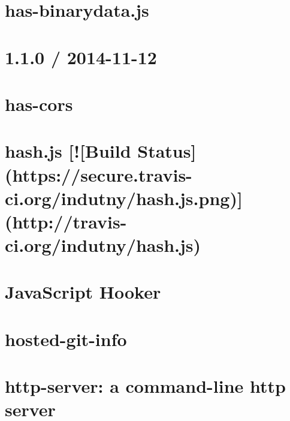 \documentclass[twoside]{book}
\newcommand{\+}{\discretionary{\mbox{\scriptsize$\hookleftarrow$}}{}{}}
\begin{document}
\chapter{has-\/binarydata.js}
\label{md_app_web_node_modules_has-binary__r_e_a_d_m_e}

\chapter{1.1.0 / 2014-\/11-\/12}
\label{md_app_web_node_modules_has-cors__history}

\chapter{has-\/cors}
\label{md_app_web_node_modules_has-cors__readme}

\chapter{hash.\+js \mbox{[}!\mbox{[}Build Status\mbox{]}(https\+://secure.travis-\/ci.org/indutny/hash.js.\+png)\mbox{]}(http\+://travis-\/ci.org/indutny/hash.js)}
\label{md_app_web_node_modules_hash_8js__r_e_a_d_m_e}

\chapter{Java\+Script Hooker}
\label{md_app_web_node_modules_hooker__r_e_a_d_m_e}

\chapter{hosted-\/git-\/info}
\label{md_app_web_node_modules_hosted-git-info__r_e_a_d_m_e}

\chapter{http-\/server\+: a command-\/line http server}
\label{md_app_web_node_modules_http-server__r_e_a_d_m_e}

\end{document}

